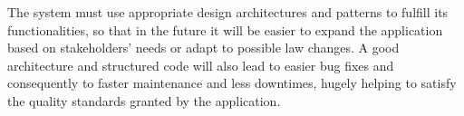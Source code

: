 The system must use appropriate design architectures and patterns to fulfill its functionalities, so that in the future it will be easier to expand the application based on stakeholders' needs or adapt to possible law changes. A good architecture and structured code will also lead to easier bug fixes and consequently to faster maintenance and less downtimes, hugely helping to satisfy the quality standards granted by the application.